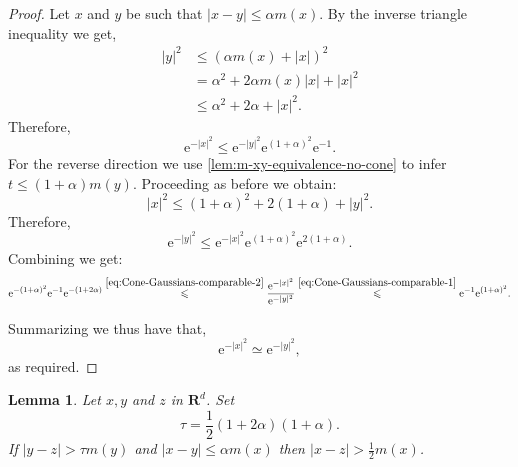 \documentclass[a4paper,oneside,10pt]{amsproc}
\theoremstyle{plain}
\newtheorem{lemma}{Lemma}
\theoremstyle{remark}
\theoremstyle{definition}
\renewcommand{\leq}{\leqslant}
\renewcommand{\leq}{\leqslant}
\newcommand{\R}{\mathbf R}
\newcommand{\e}{\mathrm{e}} %
\renewcommand{\leq}{\leqslant}%
\begin{document}
\begin{proof}
  Let $x$ and $y$ be such that $|x - y| \leq \alpha m(x)$. By the
  inverse triangle inequality we get, 
  \begin{align*}
    |y|^2 &\leq (\alpha m(x) + |x|)^2\\
    &= \alpha^2 + 2 \alpha m(x) |x| + |x|^2\\
    &\leq \alpha^2 + 2 \alpha + |x|^2.
  \end{align*}
  Therefore,
  \begin{equation}
    \label{eq:Cone-Gaussians-comparable-1}
    \e^{-|x|^2} \leq \e^{-|y|^2} \e^{(1 + \alpha)^2} \e^{-1}.
  \end{equation}
  For the reverse direction we use
  \autoref{lem:m-xy-equivalence-no-cone} to infer $t \leq (1 + \alpha)
  m(y)$. Proceeding as before we obtain:
  \begin{equation*}
    |x|^2 \leq (1 + \alpha)^2 + 2(1 + \alpha) + |y|^2.
  \end{equation*}
  Therefore,
  \begin{equation}
    \label{eq:Cone-Gaussians-comparable-2}
    \e^{-|y|^2} \leq \e^{-|x|^2} \e^{(1 + \alpha)^2} \e^{2(1 + \alpha)}.
  \end{equation}
  Combining we get:
  \begin{equation*}
    \e^{-(1 + \alpha)^2} \e^{-1} \e^{-(1 + 2\alpha)}
    \overset{\eqref{eq:Cone-Gaussians-comparable-2}}{\leq} \frac{\e^{-|x|^2}}{\e^{-|y|^2}}
    \overset{\eqref{eq:Cone-Gaussians-comparable-1}}{\leq} \e^{-1} \e^{(1 + \alpha)^2}.
  \end{equation*}

  Summarizing we thus have that,
  \begin{equation*}
    \e^{-|x|^2} \simeq \e^{-|y|^2},
  \end{equation*}
  as required.
\end{proof}
\begin{lemma}
  \label{def:Global-region-cone-lemma}
  Let $x, y$ and $z$ in $\R^d$. Set
  \begin{equation*}
    \tau = \frac12 (1 + 2\alpha)(1 + \alpha).
  \end{equation*}
  If $|y - z| > \tau m(y)$ and $|x - y| \leq \alpha m(x)$ then $|x -
  z| > \frac12 m(x)$.
\end{lemma}
\end{document}
